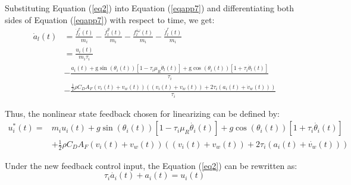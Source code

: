 \documentclass[a4paper]{cas-sc}
\begin{document}
Substituting Equation (\ref{eq2}) into Equation (\ref{eqapp7}) and differentiating both sides of Equation (\ref{eqapp7}) with respect to time, we get:
\begin{equation}
  \begin{aligned}
    \dot{a}_{l}(t) & =\frac{\dot{f}_{l}^{e}(t)}{m_{i}}-\frac{\dot{f}_{l}^{g}(t)}{m_{i}}-\frac{f_{l}^{i \omega}(t)}{m_{i}}-\frac{\dot{f}_{l}^{r}(t)}{m_{i}}                                                                                         \\
                   & =               \frac{u_{i}(t)}{m_{i} \tau_{i}}                                                                                                                                                                               \\
                   & -               \frac{a_{i}(t)+\mathrm{g} \sin \left(\theta_{i}(t)\right)\left[1-\tau_{i} \mu_{R} \dot{\theta}_{l}(t)\right]+\mathrm{g} \cos \left(\theta_{i}(t)\right)\left[1+\tau_{i} \dot{\theta}_{l}(t)\right]}{\tau_{i}} \\
                   & -               \frac{\frac{1}{2} \rho C_{D} A_{F}\left(v_{i}(t)+v_{w}(t)\right)\left(\left(v_{i}(t)+v_{w}(t)\right)+2 \tau_{i}\left(a_{i}(t)+\dot{v}_{w}(t)\right)\right)}{\tau_{i}}
  \end{aligned}
  \label{eqapp8}
\end{equation}

Thus, the nonlinear state feedback chosen for linearizing can be defined by:
\begin{equation}
  \begin{aligned}
    u_i^\ast\left(t\right)= & m_iu_i\left(t\right)+g\sin{\left(\theta_i\left(t\right)\right)}\left[1-\tau_i\mu_R\dot{\theta_i}\left(t\right)\right]+g\cos{\left(\theta_i\left(t\right)\right)}\left[1+\tau_i\dot{\theta_i}\left(t\right)\right]\ \\
                            & +\frac{1}{2}\rho C_DA_F\left(v_i\left(t\right)+v_w\left(t\right)\right)\left(\left(v_i\left(t\right)+v_w\left(t\right)\right)+2\tau_i(a_i\left(t\right)+\dot{v_w}\left(t\right))\right)
  \end{aligned}
  \label{eqapp9}
\end{equation}

Under the new feedback control input, the Equation (\ref{eq2}) can be rewritten as:
\begin{equation}
  \tau_i\dot{a_i}\left(t\right)+a_i\left(t\right)=u_i(t)
  \label{eqapp10}
\end{equation}
\end{document}
